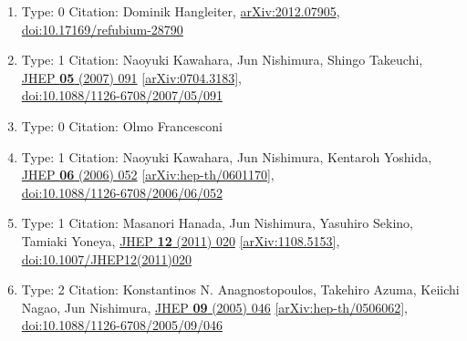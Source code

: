 \documentclass[a4paper,10pt]{article}
\begin{document}
\begin{enumerate}
\begin{enumerate}
  \item Type: 0 Citation: Dominik Hangleiter, \href{https://arxiv.org/abs/2012.07905}{arXiv:2012.07905},\\\href{https://www.doi.org/10.17169/refubium-28790}{doi:10.17169/refubium-28790}
  \item Type: 1 Citation: Naoyuki Kawahara, Jun Nishimura, Shingo Takeuchi, \href{https://www.doi.org/10.1088/1126-6708/2007/05/091}{JHEP {\bf 05} (2007) 091}  \href{https://arxiv.org/abs/0704.3183}{[arXiv:0704.3183]},\\\href{https://www.doi.org/10.1088/1126-6708/2007/05/091}{doi:10.1088/1126-6708/2007/05/091}
  \item Type: 0 Citation: Olmo Francesconi
  \item Type: 1 Citation: Naoyuki Kawahara, Jun Nishimura, Kentaroh Yoshida, \href{https://www.doi.org/10.1088/1126-6708/2006/06/052}{JHEP {\bf 06} (2006) 052}  \href{https://arxiv.org/abs/hep-th/0601170}{[arXiv:hep-th/0601170]},\\\href{https://www.doi.org/10.1088/1126-6708/2006/06/052}{doi:10.1088/1126-6708/2006/06/052}
  \item Type: 1 Citation: Masanori Hanada, Jun Nishimura, Yasuhiro Sekino, Tamiaki Yoneya, \href{https://www.doi.org/10.1007/JHEP12(2011)020}{JHEP {\bf 12} (2011) 020}  \href{https://arxiv.org/abs/1108.5153}{[arXiv:1108.5153]},\\\href{https://www.doi.org/10.1007/JHEP12(2011)020}{doi:10.1007/JHEP12(2011)020}
  \item Type: 2 Citation: Konstantinos N. Anagnostopoulos, Takehiro Azuma, Keiichi Nagao, Jun Nishimura, \href{https://www.doi.org/10.1088/1126-6708/2005/09/046}{JHEP {\bf 09} (2005) 046}  \href{https://arxiv.org/abs/hep-th/0506062}{[arXiv:hep-th/0506062]},\\\href{https://www.doi.org/10.1088/1126-6708/2005/09/046}{doi:10.1088/1126-6708/2005/09/046}

\end{enumerate}
\end{enumerate}
\end{document}
